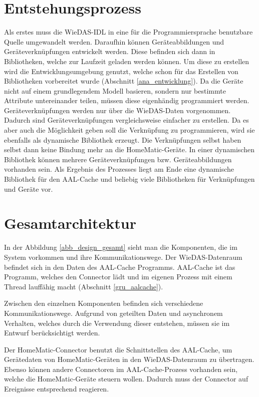 \section{Entstehungsprozess}
\label{des_entstehung}
Als erstes muss die WieDAS-IDL in eine für die Programmiersprache benutzbare Quelle
umgewandelt werden.
Daraufhin können Geräteabbildungen und Geräteverknüpfungen entwickelt werden.
Diese befinden sich dann in Bibliotheken, welche zur Laufzeit geladen werden können.
Um diese zu erstellen wird die Entwicklungsumgebung genutzt, welche schon für das
Erstellen von Bibliotheken vorbereitet wurde (Abschnitt \ref{ana_entwicklung}).
Da die Geräte nicht auf einem grundlegendem Modell basieren, sondern nur bestimmte Attribute
untereinander teilen, müssen diese eigenhändig programmiert werden.
Geräteverknüpfungen werden nur über die WieDAS-Daten vorgenommen.
Dadurch sind Geräteverknüpfungen vergleichsweise einfacher zu erstellen.
Da es aber auch die Möglichkeit geben soll die Verknüpfung zu programmieren,
wird sie ebenfalls als dynamische Bibliothek erzeugt.
Die Verknüpfungen selbst haben selbst dann keine Bindung mehr an die HomeMatic-Geräte.
In einer dynamischen Bibliothek können mehrere Geräteverknüpfungen bzw.
Geräteabbildungen vorhanden sein.
Als Ergebnis des Prozesses liegt am Ende eine dynamische Bibliothek für
den AAL-Cache und beliebig viele Bibliotheken für Verknüpfungen und Geräte vor.

\section{Gesamtarchitektur}
\label{des_gesamt}


In der Abbildung \ref{abb_design_gesamt} sieht man die Komponenten, die im System
vorkommen und ihre Kommunikationswege.
Der WieDAS-Datenraum befindet sich in den Daten des AAL-Cache Programms.
AAL-Cache ist das Programm, welches den Connector lädt und im eigenen Prozess mit
einem Thread lauffähig macht (Abschnitt \ref{gru_aalcache}).

Zwischen den einzelnen Komponenten befinden sich verschiedene Kommunikationswege.
Aufgrund von geteilten Daten und asynchronem Verhalten, welches durch die
Verwendung dieser entstehen, müssen sie im Entwurf berücksichtigt werden.

Der HomeMatic-Connector benutzt die Schnittstellen des AAL-Cache, um Gerätedaten
von HomeMatic-Geräten in den WieDAS-Datenraum zu übertragen.
Ebenso können andere Connectoren im AAL-Cache-Prozess vorhanden sein, welche
die HomeMatic-Geräte steuern wollen.
Dadurch muss der Connector auf Ereignisse entsprechend reagieren.


